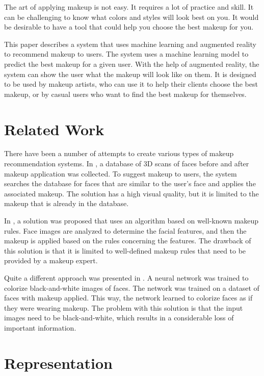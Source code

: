 \documentclass[conference]{IEEEtran}
\begin{document}
The art of applying makeup is not easy.
It requires a lot of practice and skill.
It can be challenging to know what colors and styles will look best on you.
It would be desirable to have a tool that could help you choose the best makeup for you.

This paper describes a system that uses machine learning and augmented reality to recommend makeup to users.
The system uses a machine learning model to predict the best makeup for a given user.
With the help of augmented reality, the system can show the user what the makeup will look like on them.
It is designed to be used by makeup artists, who can use it to help their clients choose the best makeup, or by casual users who want to find the best makeup for themselves.

\section{Related Work} \label{sec:related}

There have been a number of attempts to create various types of makeup recommendation systems.
In \cite{scherbaum2011computer}, a database of 3D scans of faces before and after makeup application was collected.
To suggest makeup to users, the system searches the database for faces that are similar to the user's face and applies the associated makeup.
The solution has a high visual quality, but it is limited to the makeup that is already in the database.

In \cite{alashkar2017rule}, a solution was proposed that uses an algorithm based on well-known makeup rules.
Face images are analyzed to determine the facial features, and then the makeup is applied based on the rules concerning the features.
The drawback of this solution is that it is limited to well-defined makeup rules that need to be provided by a makeup expert.

Quite a different approach was presented in \cite{shreyank2019using}.
A neural network was trained to colorize black-and-white images of faces.
The network was trained on a dataset of faces with makeup applied.
This way, the network learned to colorize faces as if they were wearing makeup.
The problem with this solution is that the input images need to be black-and-white, which results in a considerable loss of important information.

\section{Representation} \label{sec:representation}
\end{document}
